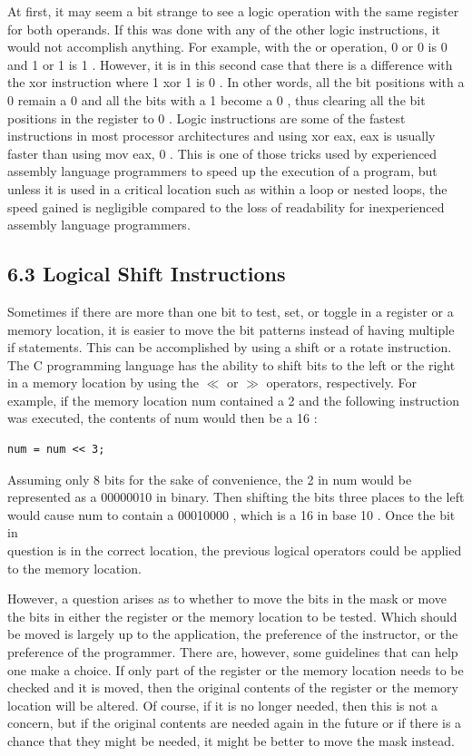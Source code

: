 \documentclass[10pt]{article}
\begin{document}
At first, it may seem a bit strange to see a logic operation with the same register for both operands. If this was done with any of the other logic instructions, it would not accomplish anything. For example, with the or operation, 0 or 0 is 0 and 1 or 1 is 1 . However, it is in this second case that there is a difference with the xor instruction where 1 xor 1 is 0 . In other words, all the bit positions with a 0 remain a 0 and all the bits with a 1 become a 0 , thus clearing all the bit positions in the register to 0 . Logic instructions are some of the fastest instructions in most processor architectures and using xor eax, eax is usually faster than using mov eax, 0 . This is one of those tricks used by experienced assembly language programmers to speed up the execution of a program, but unless it is used in a critical location such as within a loop or nested loops, the speed gained is negligible compared to the loss of readability for inexperienced assembly language programmers.

\subsection*{6.3 Logical Shift Instructions}
Sometimes if there are more than one bit to test, set, or toggle in a register or a memory location, it is easier to move the bit patterns instead of having multiple if statements. This can be accomplished by using a shift or a rotate instruction. The C programming language has the ability to shift bits to the left or the right in a memory location by using the $\ll$ or $\gg$ operators, respectively. For example, if the memory location num contained a 2 and the following instruction was executed, the contents of num would then be a 16 :

\begin{verbatim}
num = num << 3;
\end{verbatim}

Assuming only 8 bits for the sake of convenience, the 2 in num would be represented as a 00000010 in binary. Then shifting the bits three places to the left would cause num to contain a 00010000 , which is a 16 in base 10 . Once the bit in\\
question is in the correct location, the previous logical operators could be applied to the memory location.

However, a question arises as to whether to move the bits in the mask or move the bits in either the register or the memory location to be tested. Which should be moved is largely up to the application, the preference of the instructor, or the preference of the programmer. There are, however, some guidelines that can help one make a choice. If only part of the register or the memory location needs to be checked and it is moved, then the original contents of the register or the memory location will be altered. Of course, if it is no longer needed, then this is not a concern, but if the original contents are needed again in the future or if there is a chance that they might be needed, it might be better to move the mask instead.
\end{document}
